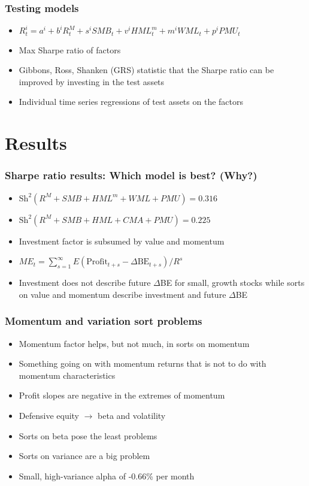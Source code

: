 \documentclass{beamer}
\begin{document}
\begin{frame}
\frametitle{Testing models}
\begin{itemize}
    \item<1-> $R_t^i = a^i + b^iR_t^M + s^iSMB_t + v^iHML_t^m + m^iWML_t + p^iPMU_t$
    \item<2-> Max Sharpe ratio of factors
    \item<2-> Gibbons, Ross, Shanken (GRS) statistic that the Sharpe ratio
    can be improved by investing in the test assets
    \item<2-> Individual time series regressions of test assets on the factors
\end{itemize}
\end{frame}

\section{Results}

\begin{frame}
\frametitle{Sharpe ratio results: Which model is best? (Why?)}
\begin{itemize}
    \item<1-> $\text{Sh}^2(R^M + SMB + HML^m + WML + PMU)=0.316$
    \item<1-> $\text{Sh}^2(R^M + SMB + HML   + CMA + PMU)=0.225$
    \item<2-> Investment factor is subsumed by value and momentum
    \item<3-> $ME_t = \sum_{s=1}^\infty E\left( \text{Profit}_{t+s} - \Delta\text{BE}_{t+s}\right) /R^s$
    \item<3-> Investment does not describe future $\Delta$BE for small, growth
    stocks while sorts on value and momentum describe investment and future
    $\Delta$BE
\end{itemize}
\end{frame}

\begin{frame}
\frametitle{Momentum and variation sort problems}
\begin{itemize}
    \item<1-> Momentum factor helps, but not much, in sorts on momentum
    \item<1-> Something going on with momentum returns that is not to do with
    momentum characteristics
    \item<2-> Profit slopes are negative in the extremes of momentum
    \item<2-> Defensive equity $\rightarrow$ beta and volatility
    \item<3-> Sorts on beta pose the least problems
    \item<4-> Sorts on variance are a big problem
    \item<4-> Small, high-variance alpha of -0.66\% per month
\end{itemize}
\end{frame}
\end{document}
